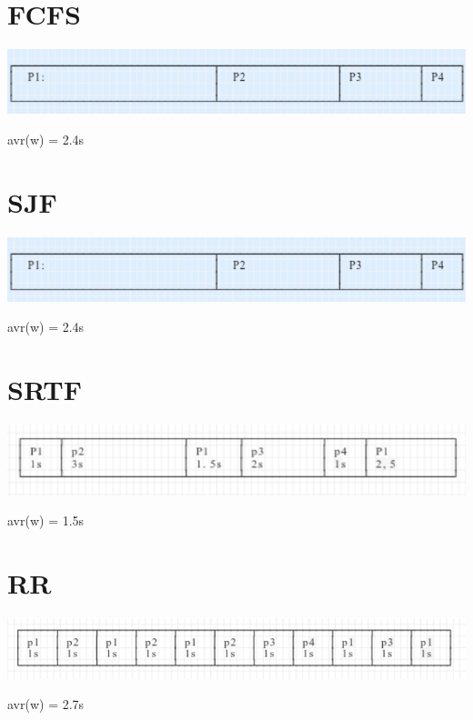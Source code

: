 \documentclass{article}
\begin{document}
\section{FCFS}
\includegraphics{02.report.scheduling.FCFS}

avr(w) = 2.4s

\section{SJF}
\includegraphics{02.report.scheduling.FCFS}

avr(w) = 2.4s

\section{SRTF}
\includegraphics{02.report.scheduling.SRTF}

avr(w) = 1.5s

\section{RR}
\includegraphics{02.report.scheduling.RR}

avr(w) = 2.7s
\end{document}
